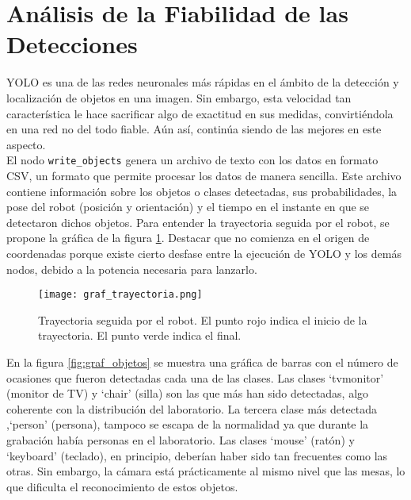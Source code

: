 \section{Análisis de la Fiabilidad de las Detecciones}

YOLO es una de las redes neuronales más rápidas en el ámbito de la detección y localización de objetos en una imagen. Sin embargo, esta velocidad tan característica le hace sacrificar algo de exactitud en sus medidas, convirtiéndola en una red no del todo fiable. Aún así, continúa siendo de las mejores en este aspecto.\\

El nodo \texttt{write\_objects} genera un archivo de texto con los datos en formato CSV, un formato que permite procesar los datos de manera sencilla. Este archivo contiene información sobre los objetos o clases detectadas, sus probabilidades, la pose del robot (posición y orientación) y el tiempo en el instante en que se detectaron dichos objetos. Para entender la trayectoria seguida por el robot, se propone la gráfica de la figura \ref{fig:graf_trayectoria}. Destacar que no comienza en el origen de coordenadas porque existe cierto desfase entre la ejecución de YOLO y los demás nodos, debido a la potencia necesaria para lanzarlo.\\

\begin{figure}[h]
	\begin{center} 
		\texttt{[image: graf\_trayectoria.png]}
	\end{center}
	\caption{Trayectoria seguida por el robot. El punto rojo indica el inicio de la trayectoria. El punto verde indica el final.}
	\label{fig:graf_trayectoria}
\end{figure}

En la figura \ref{fig:graf_objetos} se muestra una gráfica de barras con el número de ocasiones que fueron detectadas cada una de las clases. Las clases `tvmonitor' (monitor de TV) y `chair' (silla) son las que más han sido detectadas, algo coherente con la distribución del laboratorio. La tercera clase más detectada ,`person' (persona), tampoco se escapa de la normalidad ya que durante la grabación había personas en el laboratorio. Las clases `mouse' (ratón) y `keyboard' (teclado), en principio, deberían haber sido tan frecuentes como las otras. Sin embargo, la cámara está prácticamente al mismo nivel que las mesas, lo que dificulta el reconocimiento de estos objetos.\\


